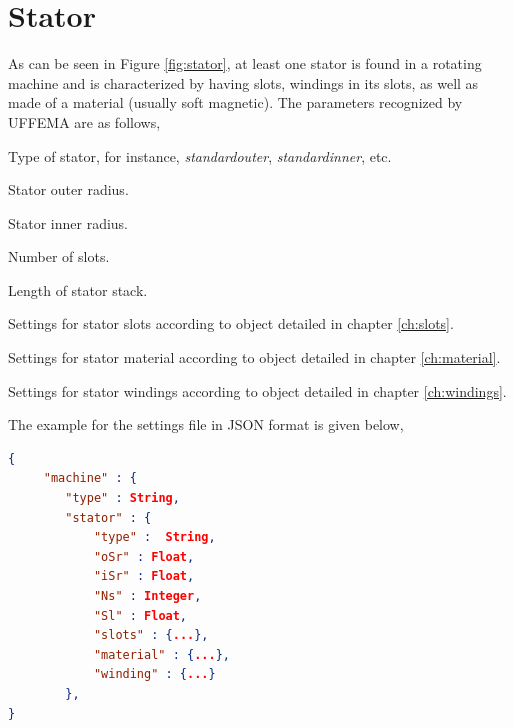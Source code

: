 \documentclass[justified]{tufte-book} %
\begin{document}
\section{Stator}
\begin{fullwidth}
As can be seen in Figure \ref{fig:stator}, at least one stator is found in a rotating machine and is characterized by having slots, windings in its slots, as well as made of a material (usually soft magnetic). The parameters recognized by UFFEMA are as follows,
\end{fullwidth}
\begin{description}[leftmargin=4cm, style=nextline]
\item[\normalfont{\ttfamily{\textbf{type}}: \textit{String}}] Type of stator, for instance, \textit{standardouter}, \textit{standardinner}, etc.
\item[\normalfont{\ttfamily{\textbf{oSr}}: \textit{Float}}] Stator outer radius.
\item[\normalfont{\ttfamily{\textbf{iSr}}: \textit{Float}}] Stator inner radius.
\item[\normalfont{\ttfamily{\textbf{Ns}}: \textit{Integer}}] Number of slots.
\item[\normalfont{\ttfamily{\textbf{Sl}}: \textit{Float}}] Length of stator stack.
\item[\normalfont{\ttfamily{\textbf{slots}}: \textit{Object}}] Settings for stator slots according to object detailed in chapter \ref{ch:slots}.
\item[\normalfont{\ttfamily{\textbf{material}}: \textit{Object}}] Settings for stator material according to object detailed in chapter \ref{ch:material}.
\item[\normalfont{\ttfamily{\textbf{winding}}: \textit{Object}}] Settings for stator windings according to object detailed in chapter \ref{ch:windings}.
\end{description}

The example for the settings file in JSON format is given below,

\begin{lstlisting}[language=json]
{
	 "machine" : {
    	"type" : String,
    	"stator" : {
      		"type" :  String,
     		"oSr" : Float,
      		"iSr" : Float,
      		"Ns" : Integer,
      		"Sl" : Float,
      		"slots" : {...},
      		"material" : {...},
      		"winding" : {...}
		},
}
\end{lstlisting}
\end{document}
